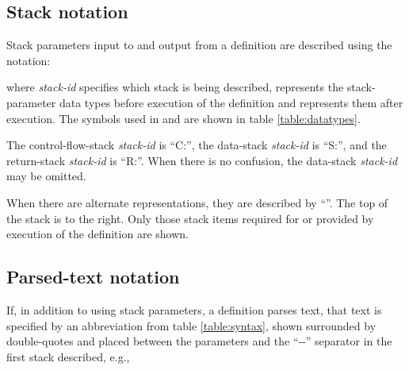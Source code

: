 \subsection{Stack notation}

Stack parameters input to and output from a definition are described
using the notation:
\begin{quote}
\end{quote}

where \emph{stack-id} specifies which stack is being described,
 represents the stack-parameter data types before
execution of the definition and  represents them
after execution. The symbols used in  and 
are shown in table \ref{table:datatypes}.

The control-flow-stack \emph{stack-id} is ``C:'', the data-stack
\emph{stack-id} is ``S:'', and the return-stack \emph{stack-id}
is ``R:''. When there is no confusion, the data-stack
\emph{stack-id} may be omitted.

When there are alternate  representations, they are
described by ``''. The top of the stack is
to the right. Only those stack items required for or provided by
execution of the definition are shown.


\subsection{Parsed-text notation}
\label{notation:parsed}

If, in addition to using stack parameters, a definition parses text,
that text is specified by an abbreviation from table \ref{table:syntax},
shown surrounded by double-quotes and placed between the 
parameters and the ``-{}-'' separator in the first stack described, e.g.,

\begin{quote}
\end{quote}

